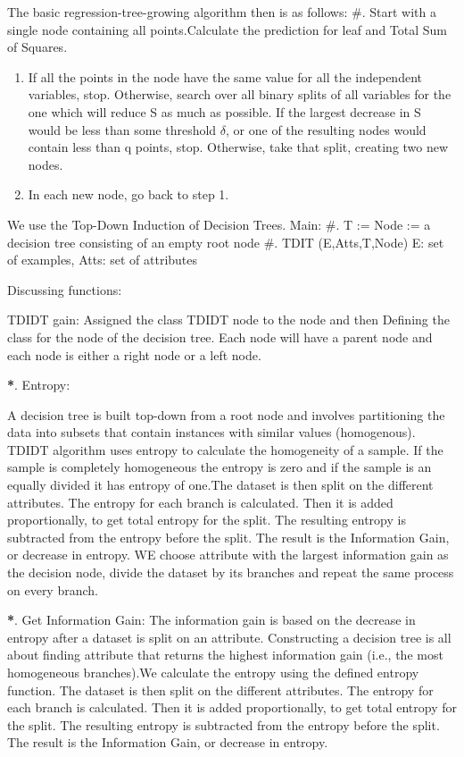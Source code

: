 \documentclass[a4paper,11pt,english]{sphinxmanual}
\begin{document}
The basic regression-tree-growing algorithm then is as follows:
\#. Start with a single node containing all points.Calculate the prediction for leaf  and Total Sum of Squares.
\begin{enumerate}
\def\theenumi{\arabic{enumi}}
\def\labelenumi{\theenumi .}
\makeatletter\def\p@enumii{\p@enumi \theenumi .}\makeatother
\item {} 
If all the points in the node have the same value for all the independent variables, stop. Otherwise, search over all binary splits of all variables for the one which will reduce S as much as possible. If the largest decrease in S would be less than some threshold \(\delta\), or one of the resulting nodes would contain less than q points, stop. Otherwise, take that split, creating two new nodes.

\item {} 
In each new node, go back to step 1.

\end{enumerate}

We use the Top-Down Induction of Decision Trees.
Main:
\#.  T := Node := a decision tree consisting of an empty root node
\#.  TDIT (E,Atts,T,Node)      E: set of examples, Atts: set of attributes

Discussing functions:

TDIDT gain: Assigned the class TDIDT node to the node and then Defining the class for the node of the decision tree. Each node will have a parent node and each node is either a right node or a left node.

{\color{red}\bfseries{}*}. Entropy:

A decision tree is built top-down from a root node and involves partitioning the data into subsets that contain instances with similar values (homogenous). TDIDT algorithm uses entropy to calculate the homogeneity of a sample. If the sample is completely homogeneous the entropy is zero and if the sample is an equally divided it has entropy of one.The dataset is then split on the different attributes. The entropy for each branch is calculated. Then it is added proportionally, to get total entropy for the split. The resulting entropy is subtracted from the entropy before the split. The result is the Information Gain, or decrease in entropy. WE choose attribute with the largest information gain as the decision node, divide the dataset by its branches and repeat the same process on every branch.

{\color{red}\bfseries{}*}. Get Information Gain:
The information gain is based on the decrease in entropy after a dataset is split on an attribute. Constructing a decision tree is all about finding attribute that returns the highest information gain (i.e., the most homogeneous branches).We calculate the entropy using the defined entropy function. The dataset is then split on the different attributes. The entropy for each branch is calculated. Then it is added proportionally, to get total entropy for the split. The resulting entropy is subtracted from the entropy before the split. The result is the Information Gain, or decrease in entropy.
\end{document}
